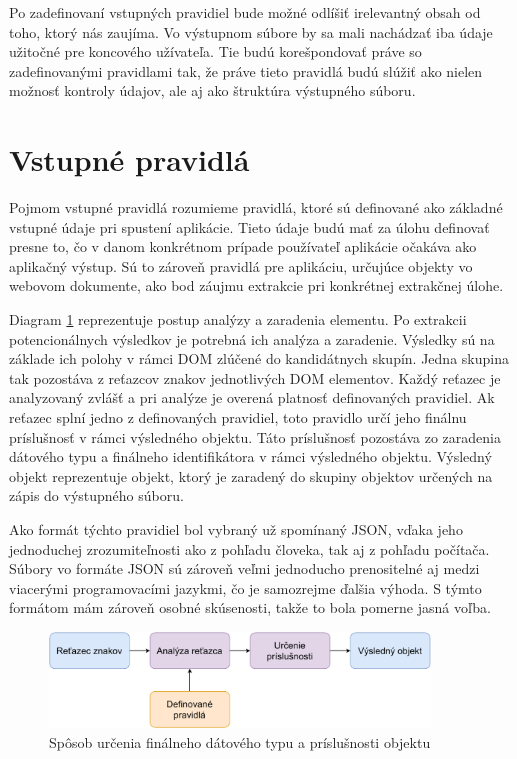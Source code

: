 Po zadefinovaní vstupných pravidiel bude možné odlíšiť irelevantný obsah od toho, ktorý nás zaujíma. Vo výstupnom súbore by sa mali nachádzať iba údaje užitočné pre koncového užívateľa. Tie budú korešpondovať práve so zadefinovanými pravidlami tak, že práve tieto pravidlá budú slúžiť ako nielen možnosť kontroly údajov, ale aj ako štruktúra výstupného súboru. 

\newpage
\section{Vstupné pravidlá}

Pojmom vstupné pravidlá rozumieme pravidlá, ktoré sú definované ako základné vstupné údaje pri spustení aplikácie. Tieto údaje budú mať za úlohu definovať presne to, čo v danom konkrétnom prípade používateľ aplikácie očakáva ako aplikačný výstup. Sú to zároveň pravidlá pre aplikáciu, určujúce objekty vo webovom dokumente, ako bod záujmu extrakcie pri konkrétnej extrakčnej úlohe. 

Diagram \ref{rules} reprezentuje postup analýzy a zaradenia elementu. Po extrakcii potencionálnych výsledkov je potrebná ich analýza a zaradenie. Výsledky sú na základe ich polohy v rámci DOM zlúčené do kandidátnych skupín. Jedna skupina tak pozostáva z reťazcov znakov jednotlivých DOM elementov. Každý reťazec je analyzovaný zvlášť a pri analýze je overená platnosť definovaných pravidiel. Ak reťazec splní jedno z definovaných pravidiel, toto pravidlo určí jeho finálnu príslušnosť v rámci výsledného objektu. Táto príslušnosť pozostáva zo zaradenia dátového typu a finálneho identifikátora v rámci výsledného objektu. Výsledný objekt reprezentuje objekt, ktorý je zaradený do skupiny objektov určených na zápis do výstupného súboru.

Ako formát týchto pravidiel bol vybraný už spomínaný JSON, vďaka jeho jednoduchej zrozumiteľnosti ako z pohľadu človeka, tak aj z pohľadu počítača. Súbory vo formáte JSON sú zároveň veľmi jednoducho prenositelné aj medzi viacerými programovacími jazykmi, čo je samozrejme ďalšia výhoda. S týmto formátom mám zároveň osobné skúsenosti, takže to bola pomerne jasná voľba.

\bigskip

\begin{figure}[hbt]
	\centering
	\includegraphics[width=0.9\textwidth]{obrazky-figures/rules.pdf}
	\caption{Spôsob určenia finálneho dátového typu a príslušnosti objektu}
	\label{rules}
\end{figure}

